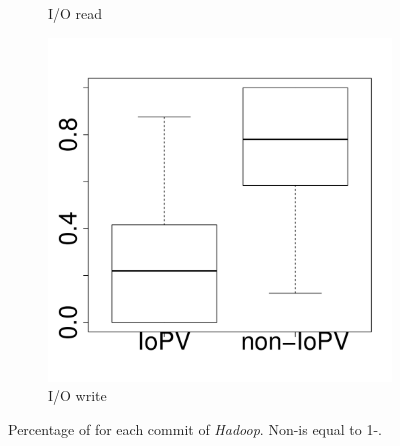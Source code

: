 \begin{figure}[t]
\begin{subfigure}{0.19\textwidth}
                \caption{I/O read}
        \end{subfigure}
        \begin{subfigure}{0.19\textwidth}
                \includegraphics[width=\linewidth]{Figures/iowrite-hadoop-boxplot.pdf}
                \caption{I/O write}
        \end{subfigure}
        
	\caption{Percentage of \inconsistent for each commit of \emph{Hadoop}. Non-\inconsistent is equal to 1-\inconsistent.} %
	\label{fig:iopv_per_commit_hadoop}
\end{figure}

